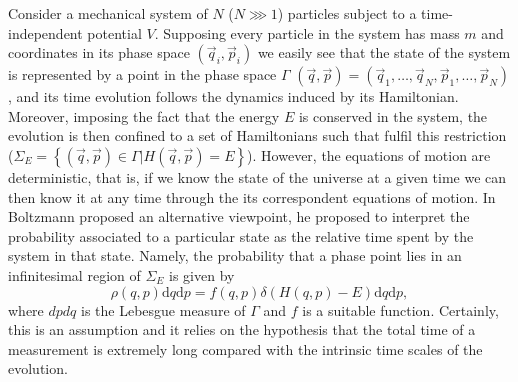
\indent Consider a mechanical system of $N$ ($N \ggg 1$) particles subject to a time-independent potential $V$. Supposing every particle in the system has mass $m$ and coordinates in its phase space $(\vec{q}_i,\vec{p}_i)$ we easily see that the state of the system is represented by a point in the phase space $\Gamma$ $(\vec{q},\vec{p})=(\vec{q}_{1},\ldots,\vec{q}_{N},\vec{p}_{1},\ldots,\vec{p}_{N})$, and its time evolution follows the dynamics induced by its Hamiltonian. Moreover, imposing the fact that the energy $E$ is conserved in the system, the evolution is then confined to a set of Hamiltonians such that fulfil this restriction ($\Sigma_{E}=\left\{(\vec{q},\vec{p})\in \Gamma | H(\vec{q},\vec{p})=E\right\}$). However, the equations of motion are deterministic, that is, if we know the state of the universe at a given time we can then know it at any time through the its correspondent equations of motion\cite{uffink_handbook_2007}. In \cite{boltzmann_uber_1866} Boltzmann proposed  an alternative viewpoint, he proposed to interpret the probability associated to a particular state as the relative time spent by the system in that state. Namely, the probability that a phase point lies in an infinitesimal region of $\Sigma_E$ is given by 
\begin{equation}
\rho(q, p) \mathrm{d} q \mathrm{d} p=f(q, p) \delta(H(q, p)-E) \mathrm{d} q \mathrm{d} p,
\end{equation}
where $dpdq$ is the Lebesgue measure of $\Gamma$ and $f$ is a suitable function. Certainly, this is an assumption and it relies on the hypothesis that the total time of a measurement is extremely long compared with the intrinsic time scales of the evolution.\\

